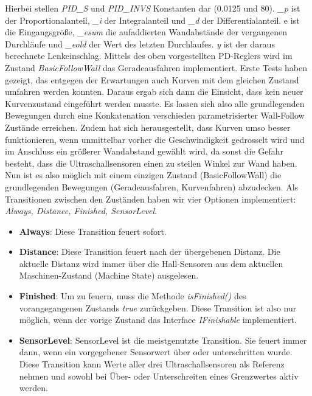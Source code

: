 Hierbei stellen \textit{PID\_S} und \textit{PID\_INVS} Konstanten dar (0.0125 und 80). \textit{\_p} ist der Proportionalanteil, \textit{\_i} der Integralanteil und \textit{\_d} der Differentialanteil. e ist die Eingangsgröße, \textit{\_esum} die aufaddierten Wandabstände der vergangenen Durchläufe und \textit{\_eold} der Wert des letzten Durchlaufes. \textit{y} ist der daraus berechnete Lenkeinschlag.
\newline
\newline
Mittels des oben vorgestellten PD-Reglers wird im Zustand \textit{BasicFollowWall} das Geradeausfahren implementiert. Erste Tests haben gezeigt, das entgegen der Erwartungen auch Kurven mit dem gleichen Zustand umfahren werden konnten. Daraus ergab sich dann die Einsicht, dass kein neuer Kurvenzustand eingeführt werden musste. Es lassen sich also alle grundlegenden Bewegungen durch eine Konkatenation verschieden parametrisierter Wall-Follow Zustände erreichen. Zudem hat sich herausgestellt, dass Kurven umso besser funktionieren, wenn unmittelbar vorher die Geschwindigkeit gedrosselt wird und im Anschluss ein größerer Wandabstand gewählt wird, da sonst die Gefahr besteht, dass die Ultraschallsensoren einen zu steilen Winkel zur Wand haben. 
Nun ist es also möglich mit einem einzigen Zustand (BasicFollowWall) die grundlegenden Bewegungen (Geradeausfahren, Kurvenfahren) abzudecken. Als Transitionen zwischen den Zuständen haben wir vier Optionen implementiert: \textit{Always, Distance, Finished, SensorLevel}. 
\begin{itemize}
	\item \textbf{Always}: Diese Transition feuert sofort.
	\item \textbf{Distance}: Diese Transition feuert nach der übergebenen Distanz. Die aktuelle Distanz wird immer über die Hall-Sensoren aus dem aktuellen Maschinen-Zustand (Machine State) ausgelesen. 
	\item \textbf{Finished}: Um zu feuern, muss die Methode \textit{isFinished()} des vorangegangenen Zustands \textit{true} zurückgeben. Diese Transition ist also nur möglich, wenn der vorige Zustand das Interface \textit{IFinishable} implementiert. 
	\item \textbf{SensorLevel}:	SensorLevel ist die meistgenutzte Transition. Sie feuert immer dann, wenn ein vorgegebener Sensorwert über oder unterschritten wurde. Diese Transition kann Werte aller drei Ultraschallsensoren als Referenz nehmen und sowohl bei Über- oder Unterschreiten eines Grenzwertes aktiv werden. 
\end{itemize}
